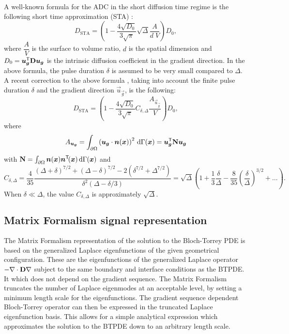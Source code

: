 \documentclass[a4paper]{article}
\begin{document}
A well-known formula for the ADC in the short diffusion time regime is the following short time approximation (STA) \cite{Mitra1992,Mitra1993}:
\begin{equation*}
    D_\text{STA} = \left(1 - \frac{4\sqrt{D_0}}{3 \sqrt{\pi}}\sqrt{\Delta} \frac{{A}}{d\; V} \right) D_0,
\end{equation*}
where $\dfrac{A}{V}$ is the surface to volume ratio, $d$ is the spatial dimension and $D_0 = \bm{u}_{\bm{g}}^{\mathsf{T}} \mathbf{D} \bm{u}_{\bm{g}}$ is the intrinsic diffusion coefficient in the gradient direction. In the above formula, the pulse duration $\delta$ is assumed to be very small compared to $\Delta$. A recent correction to the above formula \cite{schiavi2016}, taking into account the finite pulse duration $\delta$ and the gradient direction $\vec{u}_{\vec{g}}$, is the following:
\begin{equation}
    D_\text{STA} = \left(1 - \frac{4 \sqrt{D_0}}{3 \sqrt{\pi}}
    C_{\delta,\Delta}
    \frac{A_{\vec{u}_{\vec{g}}}}{V} \right) D_0,
\end{equation}
where
\begin{equation*}
    A_{\bm{u}_{\bm{g}}} = \int_{\partial \Omega} \left(\bm{u}_{\bm{g}} \cdot \bm{n}(\bm{x})\right)^2 \, \mathrm{d} \Gamma(\bm{x}) = \bm{u}_{\bm{g}}^{\mathsf{T}} \mathbf{N} \bm{u}_{\bm{g}}
\end{equation*}
with $\mathbf{N} = \int_{\partial \Omega} \bm{n}(\bm{x}) \bm{n}^{\mathsf{T}}\!(\bm{x}) \, \mathrm{d} \Gamma(\bm{x})$ and
\begin{equation*}
    C_{\delta, \Delta} = \dfrac{4}{35}
    \dfrac{\left(\Delta + \delta \right)^{7 / 2}+ \left(\Delta - \delta\right)^{7 / 2} - 2 \left(\delta^{ 7 / 2} + \Delta^{7 / 2} \right)}{\delta^2 \left( \Delta - \delta / 3\right)} = \sqrt{\Delta} \left(1 + \dfrac{1}{3} \dfrac{\delta}{\Delta} - \dfrac{8}{35} \left(\dfrac{\delta}{\Delta}\right)^{3 / 2} + \dots \right).
\end{equation*}
When $\delta \ll \Delta$, the value $C_{\delta, \Delta}$ is approximately $\sqrt{\Delta}$.





\subsection{Matrix Formalism signal representation}

The Matrix Formalism \cite{Callaghan1997,Barzykin1999} representation of the solution to the Bloch-Torrey PDE is based on the generalized Laplace eigenfunctions of the given geometrical configuration. These are the eigenfunctions of the generalized Laplace operator $-\nabla \cdot \mathbf{D} \nabla$ subject to the same boundary and interface conditions as the BTPDE. It which does not depend on the gradient sequence. The Matrix Formalism truncates the number of Laplace eigenmodes at an acceptable level, by setting a minimum length scale for the eigenfunctions. The gradient sequence dependent Bloch-Torrey operator can then be expressed in the truncated Laplace eigenfunction basis. This allows for a simple analytical expression which approximates the solution to the BTPDE down to an arbitrary length scale.
\end{document}
